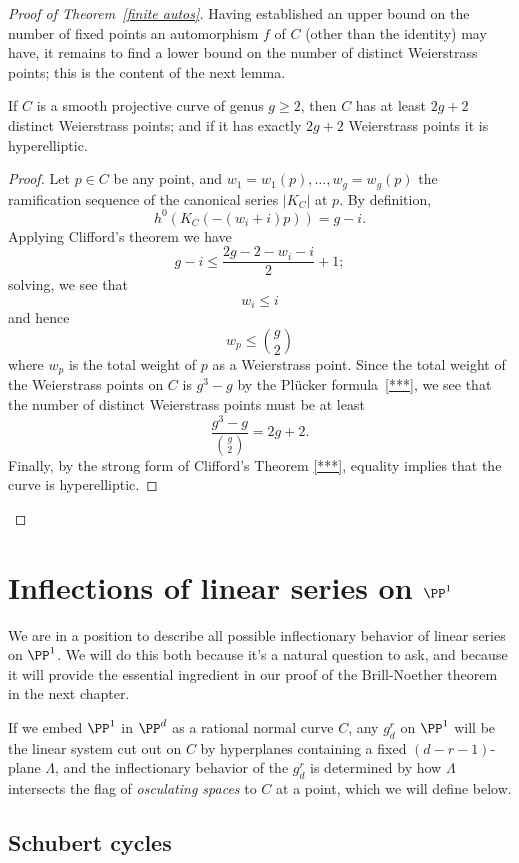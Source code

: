 \begin{proof}[Proof of Theorem~\ref{finite autos}]
Having established an upper  bound on the number of fixed points an automorphism $f$ of $C$ (other than the identity) may have, it remains to find a lower bound on the number of distinct Weierstrass points; this is the content of the next lemma.


\begin{lemma}
If $C$ is a smooth projective curve of genus $g \geq 2$, then $C$ has at least $2g+2$ distinct Weierstrass points; and if it has exactly $2g+2$ Weierstrass points it is hyperelliptic.
\end{lemma}

\begin{proof}
Let $p \in C$ be any point, and $w_1=w_1(p),\dots,w_g = w_g(p)$ the ramification sequence of the canonical series $|K_C|$ at $p$. By definition, 
$$
h^0(K_C(-(w_i+i)p)) = g - i.
$$
Applying Clifford's theorem we have
$$
g-i \leq \frac{2g - 2 - w_i - i}{2} + 1;
$$
solving, we see that
$$
w_i \leq i
$$
and hence
$$
w_p \leq \binom{g}{2}
$$
where $w_p$ is the total weight of $p$ as a Weierstrass point. Since the total weight of the Weierstrass points on $C$ is $g^3-g$ by the Pl\"ucker formula~\ref{***}, we see that the number of distinct Weierstrass points must be at least
$$
\frac{g^3-g}{\binom{g}{2}} = 2g+2.
$$
Finally, by the strong form of Clifford's Theorem \ref{***}, equality implies that the curve is hyperelliptic.\end{proof}


\end{proof}

\section{Inflections of linear series on $\PP^1$}

We are in a position to describe all possible inflectionary behavior of linear series on $\PP^1$. We will do this both because it's a natural question to ask, and because it will provide the essential ingredient in our proof of the Brill-Noether theorem in the next chapter.

If we embed $\PP^1$ in $\PP^d$ as a rational normal curve $C$, any $g^r_d$ on $\PP^1$ will be the linear system cut out on $C$ by hyperplanes containing a fixed $(d-r-1)$-plane $\Lambda$, and the inflectionary behavior of the $g^r_d$ is determined by how $\Lambda$ intersects the flag of \emph{osculating spaces}  to $C$ at a point, which we will define below. 

\subsection{Schubert cycles}\label{Schubert1}

